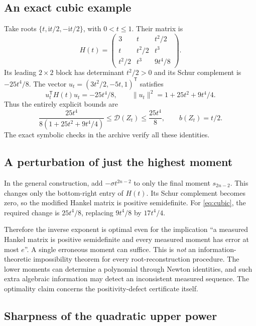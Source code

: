 \documentclass[11pt]{article}
\theoremstyle{definition}
\newcommand{\I}{\mathrm i}
\newcommand{\defect}{\mathcal D}
\begin{document}
\subsection{An exact cubic example}
\label{sec:cubic}

Take roots $\{t,\I t/2,-\I t/2\}$, with $0<t\leq1$. Their matrix is
\begin{equation}
 H(t)=\begin{pmatrix}
 3&t&t^2/2\\
 t&t^2/2&t^3\\
 t^2/2&t^3&9t^4/8
 \end{pmatrix}.
 \label{eq:cubic}
\end{equation}
Its leading $2\times2$ block has determinant $t^2/2>0$ and its Schur
complement is $-25t^4/8$. The vector
$u_t=(3t^2/2,-5t,1)^{\mathsf T}$ satisfies
\[
 u_t^{\mathsf T}H(t)u_t=-25t^4/8,
 \qquad\|u_t\|^2=1+25t^2+9t^4/4.
\]
Thus the entirely explicit bounds are
\begin{equation}
 \frac{25t^4}{8(1+25t^2+9t^4/4)}
 \leq\defect(Z_t)\leq\frac{25t^4}8,
 \qquad b(Z_t)=t/2.
 \label{eq:cubicbounds}
\end{equation}
The exact symbolic checks in the archive verify all these identities.

\subsection{A perturbation of just the highest moment}

In the general construction, add $-\sigma t^{2n-2}$ to only the final
moment $s_{2n-2}$. This changes only the bottom-right entry of $H(t)$.
Its Schur complement becomes zero, so the modified Hankel matrix is
positive semidefinite. For \eqref{eq:cubic}, the required change is
$25t^4/8$, replacing $9t^4/8$ by $17t^4/4$.

Therefore the inverse exponent is optimal even for the implication
``a measured Hankel matrix is positive semidefinite and every measured
moment has error at most $e$''. A single erroneous moment can suffice.
This is \emph{not} an information-theoretic impossibility theorem for every
root-reconstruction procedure. The lower moments can determine a polynomial
through Newton identities, and such extra algebraic information may detect
an inconsistent measured sequence. The optimality claim concerns the
positivity-defect certificate itself.

\subsection{Sharpness of the quadratic upper power}
\end{document}
